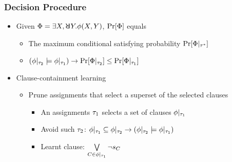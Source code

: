 \begin{frame}
    \frametitle{Decision Procedure}
    \begin{itemize}
        \item Given $\Qf=\exists X,\random{} Y.\pf(X,Y)$, $\Pr[\Phi]$ equals
              \begin{itemize}
                  \item The maximum conditional satisfying probability $\Pr[\Phi|_{\tau^*}]$
                  \item $(\phi|_{\tau_2}\models\phi|_{\tau_1})\rightarrow\Pr[\Phi|_{\tau_2}]\leq\Pr[\Phi|_{\tau_1}]$
              \end{itemize}
              \pause
        \item Clause-containment learning
              \begin{itemize}
                  \item Prune assignments that select a superset of the selected clauses
                        \begin{itemize}
                            \item An assignments $\tau_1$ selects a set of clauses $\phi|_{\tau_1}$
                            \item Avoid such $\tau_2$: $\phi|_{\tau_1}\subseteq\phi|_{\tau_2}\rightarrow(\phi|_{\tau_2}\models\phi|_{\tau_1})$
                            \item Learnt clause: $\bigvee\limits_{C\in\phi|_{\tau_1}}\lnot s_{C}$
                        \end{itemize}
              \end{itemize}
    \end{itemize}
\end{frame}

